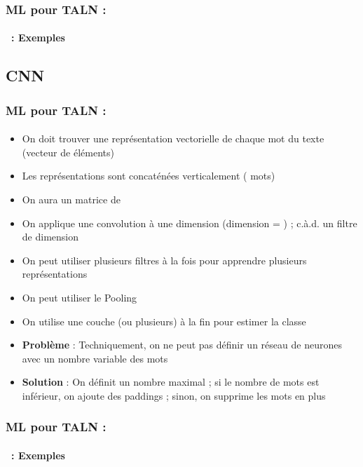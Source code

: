 \documentclass[xcolor=table]{beamer}
\begin{document}
\begin{frame}
	\frametitle{ML pour TALN : \insertsection}
	\framesubtitle{\insertsubsection\ : Exemples}
	
	
\end{frame}


\subsection{CNN}

\begin{frame}
	\frametitle{ML pour TALN : \insertsection}
	\framesubtitle{\insertsubsection}
	
	\begin{itemize}
		\item On doit trouver une représentation vectorielle de chaque mot du texte (vecteur de  éléments)
		\item Les représentations sont concaténées verticalement ( mots)
		\item On aura un matrice de 
		\item On applique une convolution à une dimension (dimension = ) ; c.à.d. un filtre de dimension 
		\item On peut utiliser plusieurs filtres à la fois pour apprendre plusieurs représentations
		\item On peut utiliser le Pooling
		\item On utilise une couche  (ou plusieurs) à la fin pour estimer la classe
		\item \textbf{Problème} : Techniquement, on ne peut pas définir un réseau de neurones avec un nombre variable des mots 
		\item \textbf{Solution} : \textcolor{yellow!50}{On définit un nombre maximal ; si le nombre de mots est inférieur, on ajoute des paddings ; sinon, on supprime les mots en plus}
	\end{itemize}
	
\end{frame}

\begin{frame}
	\frametitle{ML pour TALN : \insertsection}
	\framesubtitle{\insertsubsection\ : Exemples}
	
	
\end{frame}
\end{document}
